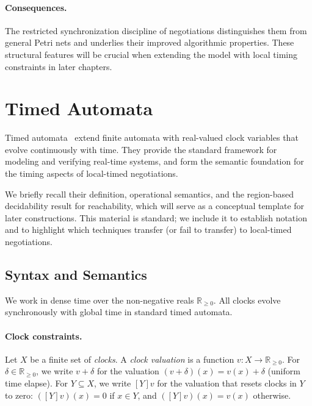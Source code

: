 \paragraph{Consequences.}
The restricted synchronization discipline of negotiations distinguishes them from
general Petri nets and underlies their improved algorithmic properties. These
structural features will be crucial when extending the model with local timing
constraints in later chapters.


\section{Timed Automata}
\label{sec:timed-automata}

Timed automata~\cite{AlurDillTA} extend finite automata with real-valued clock variables that evolve continuously with time. They provide the standard framework for modeling and verifying real-time systems, and form the semantic foundation for the timing aspects of local-timed negotiations.

We briefly recall their definition, operational semantics, and the region-based decidability result for reachability, which will serve as a conceptual template for later constructions. This material is standard; we include it to establish notation and to highlight which techniques transfer (or fail to transfer) to local-timed negotiations.


\subsection{Syntax and Semantics}

We work in dense time over the non-negative reals $\mathbb{R}_{\geq 0}$. All clocks evolve synchronously with global time in standard timed automata.

\paragraph{Clock constraints.} Let $X$ be a finite set of \emph{clocks}. A \emph{clock valuation} is a function $v : X \to \mathbb{R}_{\geq 0}$. For $\delta \in \mathbb{R}_{\geq 0}$, we write $v + \delta$ for the valuation $(v + \delta)(x) = v(x) + \delta$ (uniform time elapse). For $Y \subseteq X$, we write $[Y]v$ for the valuation that resets clocks in $Y$ to zero: $([Y]v)(x) = 0$ if $x \in Y$, and $([Y]v)(x) = v(x)$ otherwise.

